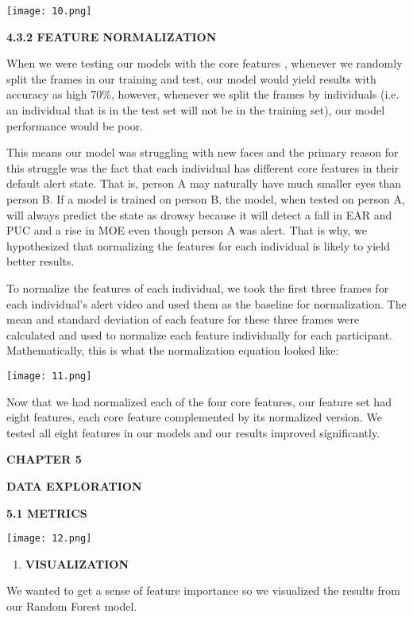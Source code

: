 \documentclass[a4paper,12pt]{article}
\begin{document}
\texttt{[image: 10.png]}

\textbf{4.3.2 FEATURE NORMALIZATION}

When we were testing our models with the core features , whenever we
randomly split the frames in our training and test, our model would
yield results with accuracy as high 70\%, however, whenever we split the
frames by individuals (i.e. an individual that is in the test set will
not be in the training set), our model performance would be poor.

This means our model was struggling with new faces and the primary
reason for this struggle was the fact that each individual has different
core features in their default alert state. That is, person A may
naturally have much smaller eyes than person B. If a model is trained on
person B, the model, when tested on person A, will always predict the
state as drowsy because it will detect a fall in EAR and PUC and a rise
in MOE even though person A was alert. That is why, we hypothesized that
normalizing the features for each individual is likely to yield better
results.

To normalize the features of each individual, we took the first three
frames for each individual's alert video and used them as the baseline
for normalization. The mean and standard deviation of each feature for
these three frames were calculated and used to normalize each feature
individually for each participant. Mathematically, this is what the
normalization equation looked like:

\texttt{[image: 11.png]}

Now that we had normalized each of the four core features, our feature
set had eight features, each core feature complemented by its normalized
version. We tested all eight features in our models and our results
improved significantly.

\textbf{CHAPTER 5}

\textbf{DATA EXPLORATION}

\textbf{5.1 METRICS}

\texttt{[image: 12.png]}

\begin{enumerate}
\def\labelenumi{\arabic{enumi}.}
\setcounter{enumi}{1}
\item
  \textbf{VISUALIZATION}
\end{enumerate}

We wanted to get a sense of feature importance so we visualized the
results from our Random Forest model.
\end{document}
